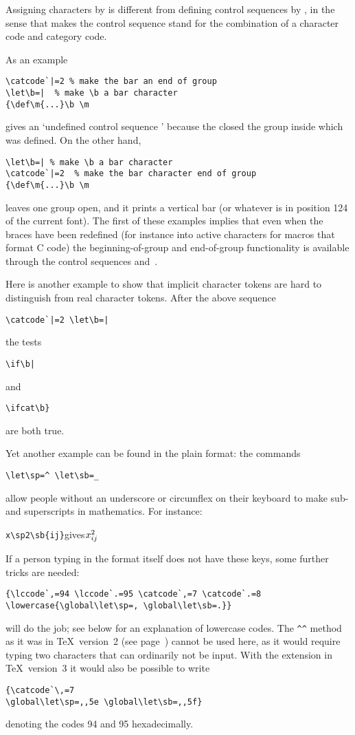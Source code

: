 Assigning characters by 
is different from defining control sequences by , 
in the sense that 
makes the control sequence stand for the combination
of a character code and category code. 

As an example
\begin{verbatim}
\catcode`|=2 % make the bar an end of group
\let\b=|  % make \b a bar character
{\def\m{...}\b \m
\end{verbatim}
gives an `undefined control sequence '
because the  closed the group inside which 
was defined. On the other hand,
\begin{verbatim}
\let\b=| % make \b a bar character
\catcode`|=2  % make the bar character end of group
{\def\m{...}\b \m
\end{verbatim}
leaves one group open, and it prints a vertical bar
(or whatever is in position 124 of the current font).
The first of these examples
implies that even when the braces have been redefined
(for instance into active characters for macros that
format C code) the beginning-of-group and end-of-group
functionality is available through the control sequences
 and~.

Here is
another example to show
that implicit character tokens are hard to distinguish
from real character tokens. After the above sequence
\begin{verbatim}
\catcode`|=2 \let\b=|
\end{verbatim}
the tests
\begin{verbatim}
\if\b|
\end{verbatim}
and
\begin{verbatim}
\ifcat\b}
\end{verbatim}
are both true.

Yet another example can be found in the plain format:
the commands
\begin{verbatim}
\let\sp=^ \let\sb=_ 
\end{verbatim}
allow people without an
underscore or circumflex on their keyboard to 
make sub- and superscripts in mathematics.
For instance:
\begin{disp}\verb>x\sp2\sb{ij}>\quad gives\quad $x\sp2\sb{ij}$\end{disp}
If a person typing in the format itself does not have
these keys, some further tricks are needed:\label{spsb:truc}
\begin{verbatim}
{\lccode`,=94 \lccode`.=95 \catcode`,=7 \catcode`.=8
\lowercase{\global\let\sp=, \global\let\sb=.}}
\end{verbatim}
will do the job; see below for an explanation of lowercase codes.
The \verb>^^> method as it was in \TeX\ version~2
(see page~\pageref{hathat}) cannot be used here,
as it would require typing two characters that can ordinarily
not be input.
With the extension in \TeX\ version~3 it would also be possible
to write
\begin{verbatim}
{\catcode`\,=7
\global\let\sp=,,5e \global\let\sb=,,5f}
\end{verbatim}
denoting the codes 94 and 95 hexadecimally.

